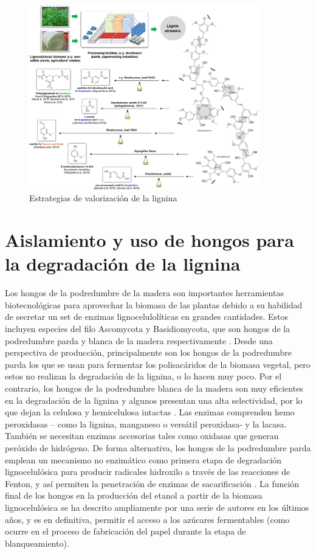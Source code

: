 \documentclass[final,a4paper,times,3p,onecolumn]{elsarticle}
\begin{document}
\begin{figure}
	\centering
	\includegraphics[width=10cm]{figura1.png}
	\caption{Estrategias de valorización de la lignina}
	\label{Fig1}
\end{figure}
\section{Aislamiento y uso de hongos para la degradación de la lignina}

Los hongos de la podredumbre de la madera son importantes herramientas biotecnológicas para aprovechar la biomasa de las plantas debido a su habilidad de secretar un set de enzimas lignocelulolíticas en grandes cantidades. Estos incluyen especies del filo Ascomycota y Basidiomycota, que son hongos de la podredumbre parda  y blanca de la madera respectivamente \cite{dashtban2010}. Desde una perspectiva de producción, principalmente son los hongos de la podredumbre parda los que se usan para fermentar los polisacáridos de la biomasa vegetal, pero estos no realizan la degradación de la lignina, o lo hacen muy poco. Por el contrario, los hongos de la podredumbre blanca de la madera son muy eficientes en la degradación de la lignina y algunos presentan una alta selectividad, por lo que dejan la celulosa y hemicelulosa intactas \cite{Makela2014}. Las enzimas comprenden hemo peroxidasas – como la lignina, manganeso o versátil peroxidasa- y la lacasa. También se necesitan enzimas accesorias tales como oxidasas que generan peróxido de hidrógeno. 
De forma alternativa, los hongos de la podredumbre parda emplean un mecanismo no enzimático como primera etapa de degradación lignocelulósica para producir radicales hidroxilo a través de las reacciones de Fenton, y así permiten la penetración de enzimas de sacarificación \cite{Arantes2012}. La función final de los hongos en la producción del etanol a partir de la biomasa lignocelulósica se ha descrito ampliamente por una serie de autores en los últimos años, y es en definitiva, permitir el acceso a los azúcares fermentables (como ocurre en el proceso de fabricación del papel durante la etapa de blanqueamiento).
 
\end{document}
